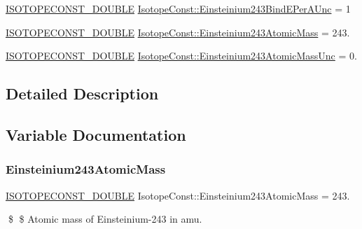 \begin{DoxyCompactItemize}
\mbox{\hyperlink{group___isotope_const-_macros_ga8f45a7272ce02c0b4c65c44636ed719a}{I\+S\+O\+T\+O\+P\+E\+C\+O\+N\+S\+T\+\_\+\+D\+O\+U\+B\+LE}} \mbox{\hyperlink{group___isotope_const-_einsteinium-_es243_ga6a0ce93dc29daf0550567997ece271f1}{Isotope\+Const\+::\+Einsteinium243\+Bind\+E\+Per\+A\+Unc}} = 1
\item 
\mbox{\hyperlink{group___isotope_const-_macros_ga8f45a7272ce02c0b4c65c44636ed719a}{I\+S\+O\+T\+O\+P\+E\+C\+O\+N\+S\+T\+\_\+\+D\+O\+U\+B\+LE}} \mbox{\hyperlink{group___isotope_const-_einsteinium-_es243_ga79abf12462f02cc5accaed8811a38bf1}{Isotope\+Const\+::\+Einsteinium243\+Atomic\+Mass}} = 243.
\item 
\mbox{\hyperlink{group___isotope_const-_macros_ga8f45a7272ce02c0b4c65c44636ed719a}{I\+S\+O\+T\+O\+P\+E\+C\+O\+N\+S\+T\+\_\+\+D\+O\+U\+B\+LE}} \mbox{\hyperlink{group___isotope_const-_einsteinium-_es243_ga4a4d7a82fd6ecb1de3e5ed3fa676f298}{Isotope\+Const\+::\+Einsteinium243\+Atomic\+Mass\+Unc}} = 0.
\end{DoxyCompactItemize}


\subsection{Detailed Description}


\subsection{Variable Documentation}
\mbox{\label{group___isotope_const-_einsteinium-_es243_ga79abf12462f02cc5accaed8811a38bf1}} 
\subsubsection{\texorpdfstring{Einsteinium243\+Atomic\+Mass}{Einsteinium243AtomicMass}}
{\footnotesize\ttfamily \mbox{\hyperlink{group___isotope_const-_macros_ga8f45a7272ce02c0b4c65c44636ed719a}{I\+S\+O\+T\+O\+P\+E\+C\+O\+N\+S\+T\+\_\+\+D\+O\+U\+B\+LE}} Isotope\+Const\+::\+Einsteinium243\+Atomic\+Mass = 243.}

\$ \$ Atomic mass of Einsteinium-\/243 in amu. \mbox{\label{group___isotope_const-_einsteinium-_es243_ga4a4d7a82fd6ecb1de3e5ed3fa676f298}} 
